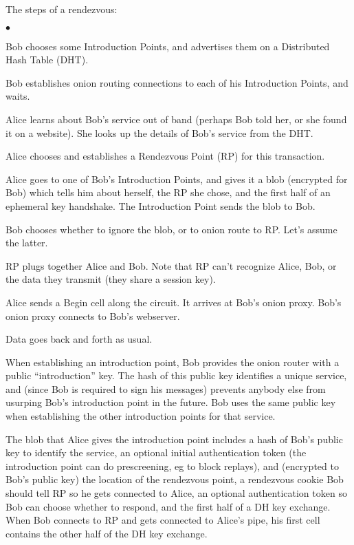 \documentclass[times,10pt,twocolumn]{article}
\newenvironment{tightlist}{\begin{list}{$\bullet$}{
  \setlength{\itemsep}{0mm}
    \setlength{\parsep}{0mm}
    }}{\end{list}}
\begin{document}
The steps of a rendezvous:
\begin{tightlist}
\item Bob chooses some Introduction Points, and advertises them on a
      Distributed Hash Table (DHT).
\item Bob establishes onion routing connections to each of his
      Introduction Points, and waits.
\item Alice learns about Bob's service out of band (perhaps Bob told her,
      or she found it on a website). She looks up the details of Bob's
      service from the DHT.
\item Alice chooses and establishes a Rendezvous Point (RP) for this
      transaction.
\item Alice goes to one of Bob's Introduction Points, and gives it a blob
      (encrypted for Bob) which tells him about herself, the RP
      she chose, and the first half of an ephemeral key handshake. The
      Introduction Point sends the blob to Bob.
\item Bob chooses whether to ignore the blob, or to onion route to RP.
      Let's assume the latter.
\item RP plugs together Alice and Bob. Note that RP can't recognize Alice,
      Bob, or the data they transmit (they share a session key).
\item Alice sends a Begin cell along the circuit. It arrives at Bob's
      onion proxy. Bob's onion proxy connects to Bob's webserver.
\item Data goes back and forth as usual.
\end{tightlist}

When establishing an introduction point, Bob provides the onion router
with a public ``introduction'' key.  The hash of this public key
identifies a unique service, and (since Bob is required to sign his
messages) prevents anybody else from usurping Bob's introduction point
in the future. Bob uses the same public key when establishing the other
introduction points for that service.

The blob that Alice gives the introduction point includes a hash of Bob's
public key to identify the service, an optional initial authentication
token (the introduction point can do prescreening, eg to block replays),
and (encrypted to Bob's public key) the location of the rendezvous point,
a rendezvous cookie Bob should tell RP so he gets connected to
Alice, an optional authentication token so Bob can choose whether to respond,
and the first half of a DH key exchange. When Bob connects to RP
and gets connected to Alice's pipe, his first cell contains the
other half of the DH key exchange.
\end{document}
